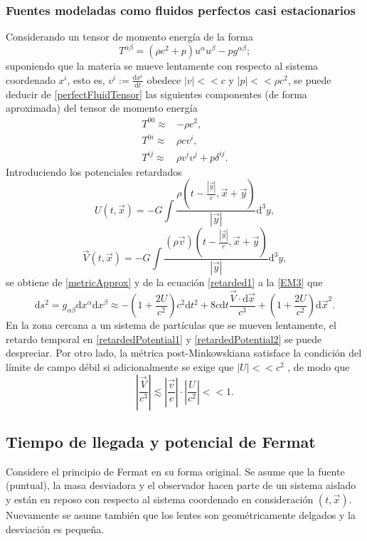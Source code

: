 \subsubsection{Fuentes modeladas como fluidos perfectos casi estacionarios}
Considerando un tensor de momento energía de la forma
\begin{equation}\label{perfectFluidTensor}
	T^{\alpha\beta} = (\rho c^2+p)u^\alpha u^\beta-pg^{\alpha\beta};
\end{equation}
suponiendo que la materia se mueve lentamente con respecto al sistema coordenado $x^i$, esto es, $v^i := \frac{\mathrm{d}x^i}{\mathrm{d}t}$ obedece $|v|<<c$ y $|p|<<\rho c^2$, se puede deducir de \eqref{perfectFluidTensor} las siguientes componentes (de forma aproximada) del tensor de momento energía
\begin{align}\label{EM1}
T^{00} \approx& -\rho c^2,\\
\label{EM2}
T^{0i} \approx& \rho c v^i,\\
\label{EM3}
T^{ij} \approx& \rho v^iv^j+p\delta^{ij}.
\end{align}
Introduciendo los potenciales retardados
\begin{equation}\label{retardedPotential1}
U(t,\vec{x})=-G\int\frac{\rho(t-\frac{|\vec{y}|}{c}, \vec{x}+\vec{y})}{|\vec{y}|}\mathrm{d}^3y,
\end{equation}
\begin{equation}\label{retardedPotential2}
	\vec{V}(t,\vec{x}) = -G \int \frac{(\rho\vec{v})(t-\frac{|\vec{y}|}{c}, \vec{x}+\vec{y})}{|\vec{y}|}\mathrm{d}^3y,
\end{equation}
se obtiene de \eqref{metricApprox} y de la ecuación \eqref{retarded1} a la \eqref{EM3} que
\begin{equation}\label{postNewtonianArc}
\mathrm{d}s^2 = g_{\alpha\beta}\mathrm{d}x^\alpha\mathrm{d}x^\beta \approx -\left(1+\frac{2U}{c^2}\right)c^2\mathrm{d}t^2+8c\mathrm{d}t \frac{\vec{V}\cdot \mathrm{d}\vec{x}}{c^3}+\left(1+\frac{2U}{c^2}\right) \mathrm{d}\vec{x}^2.
\end{equation}
En la zona cercana a un sistema de partículas que se mueven lentamente, el retardo temporal en \eqref{retardedPotential1} y \eqref{retardedPotential2} se puede despreciar. Por otro lado, la métrica post-Minkowskiana satisface la condición del límite de campo débil si adicionalmente se exige que $|U|<<c^2$ \cite{schneider_ehlers_falco_1992}, de modo que
$$\left|\frac{\vec{V}}{c^3}\right| \lesssim \left| \frac{\vec{v}}{c}\right| \cdot \left| \frac{U}{c^2} \right|<<1.$$
\subsection{Tiempo de llegada y potencial de Fermat}
Considere el principio de Fermat en su forma original. Se asume que la fuente (puntual), la masa desviadora y el observador hacen parte de un sistema aislado y están en reposo con respecto al sistema coordenado en consideración $(t,\vec{x})$. Nuevamente se asume también que los lentes son geométricamente delgados y la desviación es pequeña.
